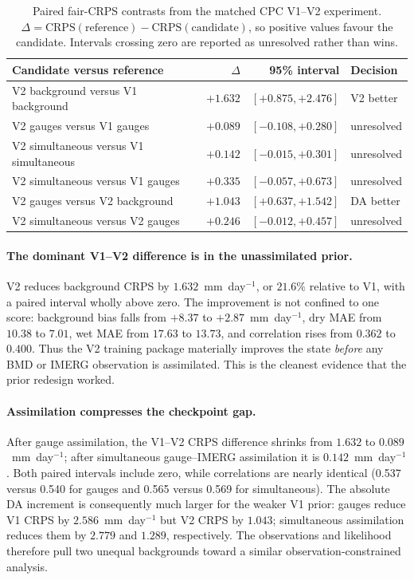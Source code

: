 \begin{table}[htbp]
\centering
\caption{Paired fair-CRPS contrasts from the matched CPC V1--V2 experiment.
$\Delta=\mathrm{CRPS}(\mathrm{reference})-
\mathrm{CRPS}(\mathrm{candidate})$, so positive values favour the candidate.
Intervals crossing zero are reported as unresolved rather than wins.}
\label{tab:ablation-v1-v2-paired}
\small
\begin{tabular}{lrrl}
\hline
Candidate versus reference & $\Delta$ & 95\% interval & Decision \\
\hline
V2 background versus V1 background & $+1.632$ & $[+0.875,+2.476]$ & V2 better \\
V2 gauges versus V1 gauges & $+0.089$ & $[-0.108,+0.280]$ & unresolved \\
V2 simultaneous versus V1 simultaneous & $+0.142$ & $[-0.015,+0.301]$ & unresolved \\
V2 simultaneous versus V1 gauges & $+0.335$ & $[-0.057,+0.673]$ & unresolved \\
V2 gauges versus V2 background & $+1.043$ & $[+0.637,+1.542]$ & DA better \\
V2 simultaneous versus V2 gauges & $+0.246$ & $[-0.012,+0.457]$ & unresolved \\
\hline
\end{tabular}
\end{table}

\paragraph{The dominant V1--V2 difference is in the unassimilated prior.}
V2 reduces background CRPS by $1.632$~mm~day$^{-1}$, or $21.6\%$ relative to
V1, with a paired interval wholly above zero. The improvement is not confined
to one score: background bias falls from $+8.37$ to $+2.87$~mm~day$^{-1}$,
dry MAE from $10.38$ to $7.01$, wet MAE from $17.63$ to $13.73$, and
correlation rises from $0.362$ to $0.400$. Thus the V2 training package
materially improves the state \emph{before} any BMD or IMERG observation is
assimilated. This is the cleanest evidence that the prior redesign worked.

\paragraph{Assimilation compresses the checkpoint gap.}
After gauge assimilation, the V1--V2 CRPS difference shrinks from $1.632$ to
$0.089$~mm~day$^{-1}$; after simultaneous gauge--IMERG assimilation it is
$0.142$~mm~day$^{-1}$. Both paired intervals include zero, while correlations
are nearly identical (0.537 versus 0.540 for gauges and 0.565 versus 0.569 for
simultaneous). The absolute DA increment is consequently much larger for the
weaker V1 prior: gauges reduce V1 CRPS by $2.586$~mm~day$^{-1}$ but V2 CRPS by
$1.043$; simultaneous assimilation reduces them by $2.779$ and $1.289$,
respectively. The observations and likelihood therefore pull two unequal
backgrounds toward a similar observation-constrained analysis.

